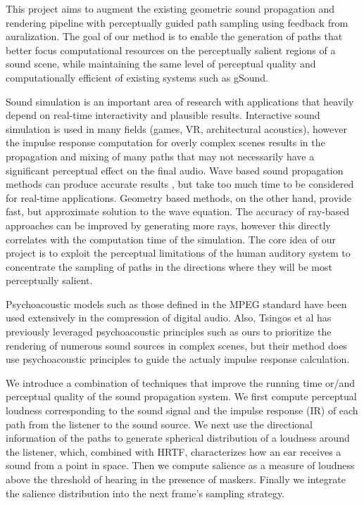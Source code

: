 This project aims to augment the existing geometric sound propagation and rendering pipeline with perceptually guided path sampling using feedback from auralization. The goal of our method is to enable the generation of paths that better focus computational resources on the perceptually salient regions of a sound scene, while maintaining the same level of perceptual quality and computationally efficient of existing systems such as gSound.

Sound simulation is an important area of research with applications that heavily depend on real-time interactivity and plausible results. Interactive sound simulation is used in many fields (games, VR, architectural acoustics), however the impulse response computation for overly complex scenes results in the propagation and mixing of many paths that may not necessarily have a significant perceptual effect on the final audio. Wave based sound propagation methods can produce accurate results \cite{waves}, but take too much time to be considered for real-time applications. Geometry based methods, on the other hand, provide fast, but approximate solution to the wave equation. The accuracy of ray-based approaches can be improved by generating more rays, however this directly correlates with the computation time of the simulation. The core idea of our project is to exploit the perceptual limitations of the human auditory system to concentrate the sampling of paths in the directions where they will be most perceptually salient.

Psychoacoustic models such as those defined in the MPEG standard have been used extensively in the compression of digital audio.
Also, Tsingos et al has previously leveraged psychoacoustic principles such as ours to prioritize the rendering of numerous sound sources in complex scenes, but their method does use psychoacoustic principles to guide the actualy impulse response calculation.

We introduce a combination of techniques that improve the running time or/and perceptual quality of the sound propagation system. We first compute perceptual loudness corresponding to the sound signal and the impulse response (IR) of each path from the listener to the sound source. We next use the directional information of the paths to generate spherical distribution of a loudness around the listener, which, combined with HRTF, characterizes how an ear receives a sound from a point in space. Then we compute salience as a measure of loudness above the threshold of hearing in the presence of maskers. Finally  we integrate the salience distribution into the next frame's sampling strategy.

